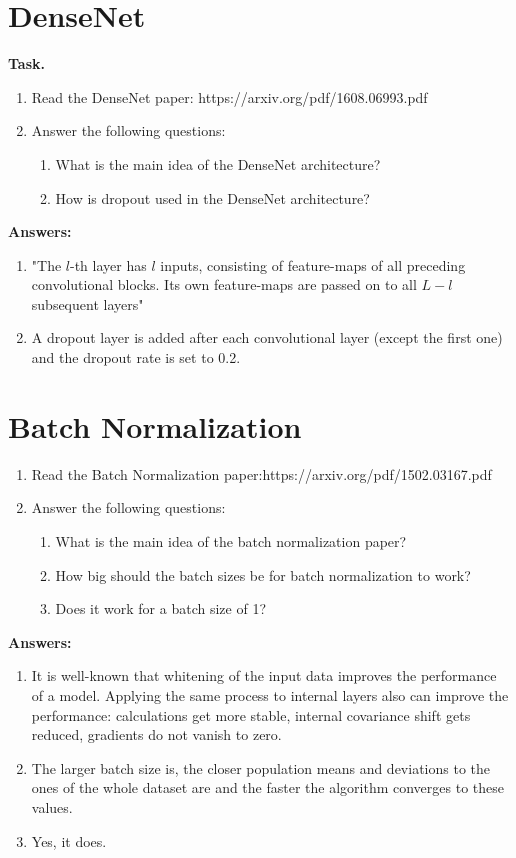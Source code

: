 \documentclass{article}
\begin{document}
\section{DenseNet}

{\bfseries Task.} 
\begin{enumerate}
	\item Read the DenseNet paper: https://arxiv.org/pdf/1608.06993.pdf	\item Answer the following questions: 
	\begin{enumerate}
		\item What is the main idea of the DenseNet architecture?
		\item How is dropout used in the DenseNet architecture?
	\end{enumerate}
\end{enumerate}
{\bfseries Answers:}
\begin{enumerate}[label=(\alph*)]
	\item "The $l$-th layer has $l$ inputs, consisting of feature-maps of all preceding convolutional blocks. Its own feature-maps are passed on to all $L-l$ subsequent layers"
	\item A dropout layer is added after each convolutional layer (except the first one) and the dropout rate is set to 0.2.
\end{enumerate}

\section{Batch Normalization}
\begin{enumerate}
	\item Read the Batch Normalization paper:https://arxiv.org/pdf/1502.03167.pdf
	\item Answer the following questions: 
	\begin{enumerate}
		\item What is the main idea of the batch normalization paper?
		\item How big should the batch sizes be for batch normalization to work?
		\item Does it work for a batch size of 1?
	\end{enumerate}
\end{enumerate}
{\bfseries Answers:}
\begin{enumerate}[label=(\alph*)]
	\item It is well-known that whitening of the input data improves the performance of a model. Applying the same process to internal layers also can improve the performance: calculations get more stable, internal covariance shift gets reduced, gradients do not vanish to zero. 
	\item The larger batch size is, the closer population means and deviations to the ones of the whole dataset are and the faster the algorithm converges to these values.
	\item Yes, it does.
\end{enumerate}
\end{document}
